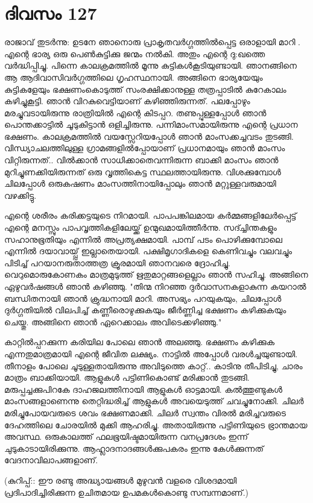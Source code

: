  
\section{ദിവസം 127}


രാജാവ്‌ തുടര്‍ന്നു: ഉടനേ ഞാനൊരു പ്രാകൃതവര്‍ഗ്ഗത്തില്‍പ്പെട്ട ഒരാളായി മാറി . എന്റെ ഭാര്യ ഒരു പെണ്‍കുട്ടിക്കു ജന്മം നല്‍കി. അതും എന്റെ ദു:ഖത്തെ വര്‍ദ്ധിപ്പിച്ചു. പിന്നെ കാലക്രമത്തില്‍ മൂന്നു കുട്ടികള്‍കൂടിയുണ്ടായി. ഞാനങ്ങിനെ ആ ആദിവാസിവര്‍ഗ്ഗത്തിലെ ഗൃഹസ്ഥനായി. അങ്ങിനെ ഭാര്യയേയും കുട്ടികളേയും ഭക്ഷണംകൊടുത്ത്‌ സംരക്ഷിക്കാനുള്ള തത്രപ്പാടില്‍ കുറേകാലം കഴിച്ചുകൂട്ടി. ഞാന്‍ വിറകുവെട്ടിയാണ്‌ കഴിഞ്ഞിരുന്നത്‌. പലപ്പോഴും മരച്ചുവടായിരുന്നു രാത്രിയില്‍ എന്റെ കിടപ്പറ. തണുപ്പുള്ളപ്പോള്‍ ഞാന്‍ പൊന്തക്കാട്ടില്‍ ചൂടുകിട്ടാന്‍ ഒളിച്ചിരുന്നു. പന്നിമാംസമായിരുന്നു എന്റെ പ്രധാന ഭക്ഷണം. കാലക്രമത്തില്‍ വയസ്സേറിയപ്പോള്‍ ഞാന്‍ മാംസക്കച്ചവടം തുടങ്ങി. വിന്ധ്യാചലത്തിലുള്ള ഗ്രാമങ്ങളില്‍പ്പോയാണ്‌ പ്രധാനമായും ഞാന്‍ മാംസം വിറ്റിരുന്നത്‌.. വില്‍ക്കാന്‍ സാധിക്കാതെവന്നിരുന്ന ബാക്കി മാംസം ഞാന്‍ മുറിച്ചുണക്കിയിരുന്നത്‌ ഒരു വൃത്തികെട്ട സ്ഥലത്തായിരുന്നു. വിശക്കുമ്പോള്‍ ചിലപ്പോള്‍  ഒരുകഷണം മാംസത്തിനായിപ്പോലും  ഞാന്‍ മറ്റുള്ളവരുമായി വഴക്കിട്ടു.

എന്റെ ശരീരം കരിക്കട്ടയുടെ നിറമായി. പാപപങ്കിലമായ കര്‍മ്മങ്ങളിലേര്‍പ്പെട്ട്‌ എന്റെ മനസ്സും പാപവൃത്തികളിലേയ്ക്ക്‌ ഉന്മുഖമായിത്തീര്‍ന്നു. സദ്ച്ചിന്തകളും സഹാനുഭൂതിയും എന്നില്‍ അപ്രത്യക്ഷമായി. പാമ്പ്‌ പടം പൊഴിക്കുമ്പോലെ എന്നില്‍ ദയാവായ്പ്പ്‌ ഇല്ലാതെയായി. പക്ഷിമൃഗാദികളെ കെണിവച്ചും വലവച്ചും പിടിച്ച്‌ പറയാനരുതാത്തത്ര ക്രൂരമായി ഞാനവരെ ദ്രോഹിച്ചു. വെറുമൊരുകോണകം മാത്രമുടുത്ത്‌ ഋതുമാറ്റങ്ങളെല്ലാം ഞാന്‍ സഹിച്ചു. അങ്ങിനെ ഏഴുവര്‍ഷങ്ങള്‍ ഞാന്‍ കഴിഞ്ഞു. "തിന്മ നിറഞ്ഞ ദുര്‍വാസനകളാകുന്ന കയറാല്‍ ബന്ധിതനായി ഞാന്‍ ക്രുദ്ധനായി മാറി. അസഭ്യം പറയുകയും, ചിലപ്പോള്‍ ദുര്‍ഗ്ഗതിയില്‍ വിലപിച്ച്‌ കണ്ണീരൊഴുക്കുകയും ജീര്‍ണ്ണിച്ച ഭക്ഷണം കഴിക്കുകയും ചെയ്തു. അങ്ങിനെ ഞാന്‍ ഏറെക്കാലം അവിടെക്കഴിഞ്ഞു."

കാറ്റില്‍പ്പറക്കുന്ന കരിയില പോലെ ഞാന്‍ അലഞ്ഞു. ഭക്ഷണം കഴിക്കുക എന്നതുമാത്രമായി എന്റെ ജീവിത ലക്ഷ്യം. നാട്ടില്‍ അപ്പോള്‍ വരള്‍ച്ചയുണ്ടായി. തീനാളം പോലെ ചൂടുള്ളതായിരുന്നു അവിടുത്തെ കാറ്റ്‌.. കാടിനു തീപിടിച്ചു, ചാരം മാത്രം ബാക്കിയായി. ആളുകള്‍ പട്ടിണികൊണ്ട്‌ മരിക്കാന്‍ തുടങ്ങി. മരുപ്പച്ചക്കുപിറകേ ദാഹജലത്തിനായി ആളുകള്‍ ഓട്ടമായി. കല്‍ത്തുണ്ടുകള്‍ മാംസങ്ങളാണെന്നു തെറ്റിദ്ധരിച്ച്‌ ആളുകള്‍ അവയെടുത്ത്‌ ചവച്ചുനോക്കി. ചിലര്‍ മരിച്ചുപോയവരുടെ ശവം ഭക്ഷണമാക്കി. ചിലര്‍ സ്വന്തം വിരല്‍ മരിച്ചവരുടെ ദേഹത്തിലെ ചോരയില്‍ മുക്കി ആഹരിച്ചു. അതായിരുന്നു പട്ടിണിയുടെ ഭ്രാന്തമായ അവസ്ഥ. ഒരുകാലത്ത്‌ ഫലഭൂയിഷ്ടമായിരുന്ന വനപ്രദേശം ഇന്ന് ചുടുകാടായിരിക്കുന്നു. ആഹ്ലാദനാദങ്ങള്‍ക്കുപകരം ഇന്നു കേള്‍ക്കുന്നത്‌ വേദനാവിലാപങ്ങളാണ്‌.

(കുറിപ്പ്‌:: ഈ രണ്ടു അദ്ധ്യായങ്ങള്‍ മുഴുവന്‍ വളരെ വിശദമായി പ്രദിപാദിച്ചിരിക്കുന്ന ഉചിതമായ ഉപമകള്‍കൊണ്ടു സമ്പന്നമാണ്‌.)

